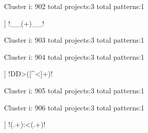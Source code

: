 Cluster i: 902
total projects:3
total patterns:1
\begin{multicols}{1}
\begin{description}[noitemsep,topsep=0pt]
\item [[3] ] \cverb!__(\w+)__!
\end{description}
\end{multicols}







Cluster i: 903
total projects:3
total patterns:1
\begin{multicols}{1}
\begin{description}[noitemsep,topsep=0pt]
\item [[3] ] \cverb!\[[^]]+]$!
\end{description}
\end{multicols}







Cluster i: 904
total projects:3
total patterns:1
\begin{multicols}{1}
\begin{description}[noitemsep,topsep=0pt]
\item [[3] ] \cverb!DD>([^<]+)!
\end{description}
\end{multicols}







Cluster i: 905
total projects:3
total patterns:1
\begin{multicols}{1}
\end{multicols}







Cluster i: 906
total projects:3
total patterns:1
\begin{multicols}{1}
\begin{description}[noitemsep,topsep=0pt]
\item [[3] ] \cverb!(.+):<(.+)!
\end{description}
\end{multicols}







